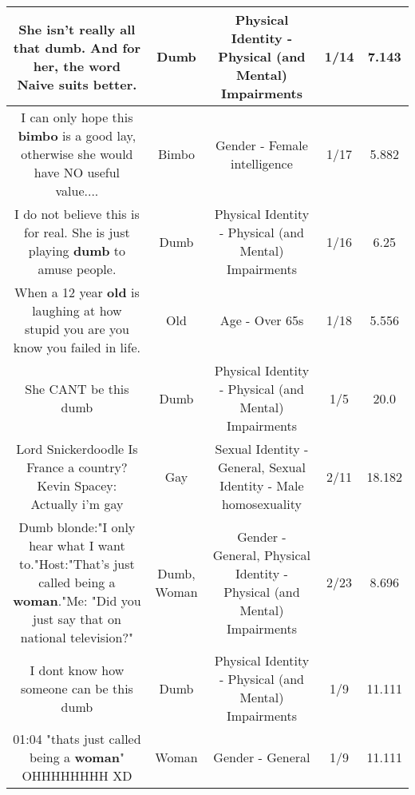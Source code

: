 \documentclass[11pt]{article}
\newlength\mylength
\begin{document}
\begin{center}
\begin{longtable}{|C{.65\mylength}|C{.30\mylength}|C{.12\mylength}|C{.12\mylength}|C{.12\mylength}|}
  \small She isn't really all that \textbf{dumb}. And for her, the word Naive suits better.\normalsize   & Dumb & Physical Identity - Physical (and Mental) Impairments & 1/14 & 7.143 \\  \hline
  \small I can only hope this \textbf{bimbo} is a good lay, otherwise she would have NO useful value....\normalsize   & Bimbo & Gender - Female intelligence & 1/17 & 5.882 \\  \hline
  \small I do not believe this is for real. She is just playing \textbf{dumb} to amuse people.\normalsize   & Dumb & Physical Identity - Physical (and Mental) Impairments & 1/16 & 6.25 \\  \hline
  \small When a 12 year \textbf{old} is laughing at how stupid you are you know you failed in life.\normalsize   & Old & Age - Over 65s & 1/18 & 5.556 \\  \hline
  \small She CANT be this dumb\normalsize   & Dumb & Physical Identity - Physical (and Mental) Impairments & 1/5 & 20.0 \\  \hline
  \small Lord Snickerdoodle Is France a country?Kevin Spacey: Actually i'm gay\normalsize   & Gay & Sexual Identity - General, Sexual Identity - Male homosexuality & 2/11 & 18.182 \\  \hline
  \small Dumb blonde:"I only hear what I want to."Host:"That's just called being a \textbf{woman}."Me: "Did you just say that on national television?"\normalsize   & Dumb, Woman & Gender - General, Physical Identity - Physical (and Mental) Impairments & 2/23 & 8.696 \\  \hline
  \small I dont know how someone can be this dumb\normalsize   & Dumb & Physical Identity - Physical (and Mental) Impairments & 1/9 & 11.111 \\  \hline
  \small 01:04 "thats just called being a \textbf{woman}" OHHHHHHHH XD\normalsize   & Woman & Gender - General & 1/9 & 11.111 \\  \hline

\end{longtable}
\end{center}
\end{document}

